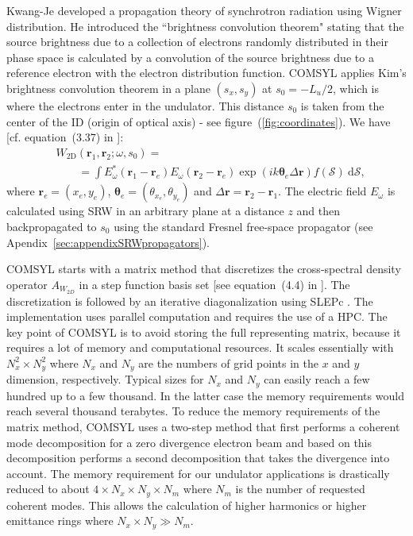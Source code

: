 \documentclass{iucr}              %
\begin{document}
Kwang-Je  developed a propagation theory of synchrotron radiation using Wigner distribution. He introduced the ``brightness convolution theorem" stating that the source brightness due to a collection of electrons randomly distributed in their phase space is calculated by a convolution of the source brightness due to a reference electron with the electron distribution function. 
COMSYL applies Kim's brightness convolution theorem in a plane $(s_x,s_y)$ at $s_0=-L_u\big/2$, which is where the  electrons enter in the undulator. This distance $s_0$ is taken from the center of the ID (origin of optical axis) - see figure~(\ref{fig:coordinates}). We have [cf. equation~(3.37) in \cite{glassThesis}]:
\begin{equation}\label{eq:comsyl_W2D}
\begin{split}
& W_\text{2D}(\textbf{r}_1,\textbf{r}_2;\omega,s_0) = \\
&\qquad=\int E_\omega^*(\textbf{r}_1-\textbf{r}_e)
    E_\omega(\textbf{r}_2-\textbf{r}_e) \exp(i k \mathbf{\theta}_e\Delta\textbf{r})f(\mathcal{S})~\text{d}\mathcal{S},
\end{split}
\end{equation}
where $\textbf{r}_e=(x_e,y_e)$, $\mathbf{\theta}_e=(\theta_{x_e},\theta_{y_e})$ and $\Delta\textbf{r}=\textbf{r}_2-\textbf{r}_1$. The electric field $E_\omega$ is calculated using SRW in an arbitrary plane at a distance $z$ and then backpropagated to $s_0$ using the standard Fresnel free-space propagator (see Apendix~\ref{sec:appendixSRWpropagators}).

COMSYL starts with a matrix method that discretizes the cross-spectral density operator $A_{W_{2D}}$ in a step function basis set [see equation~(4.4) in \cite{glassThesis}]. The discretization is followed by an iterative diagonalization using SLEPc \cite{SLEPc}. The implementation uses parallel computation and requires the use of a HPC. The key point of COMSYL is to avoid storing the full representing matrix, because it requires a lot of memory and computational resources. It scales essentially with $N_x^2 \times N_y^2$ where $N_x$ and $N_y$ are the numbers of grid points in the $x$ and $y$ dimension, respectively. Typical sizes for $N_x$ and $N_y$ can easily reach a few hundred up to a few thousand. In the latter case the memory requirements would reach several thousand terabytes. To reduce the memory requirements of the matrix method, COMSYL uses a two-step method that first performs a coherent mode decomposition for a zero divergence electron beam and based on this decomposition performs a second decomposition that takes the divergence into account. The memory requirement for our undulator applications is drastically reduced to about $4 \times N_x \times N_y \times N_m$ where $N_m$ is the number of requested coherent modes. This allows the calculation of higher harmonics or higher emittance rings where $N_x \times N_y \gg N_m$. 
\end{document}

